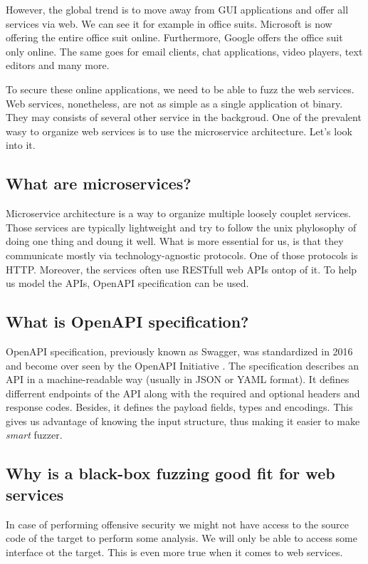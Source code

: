 However, the global trend is to move away from GUI applications and offer all services via web. We can see it for example in office suits. Microsoft is now offering the entire office suit online. Furthermore, Google offers the office suit only online. The same goes for email clients, chat applications, video players, text editors and many more.

To secure these online applications, we need to be able to fuzz the web services. Web services, nonetheless, are not as simple as a single application ot binary. They may consists of several other service in the backgroud. One of the prevalent wasy to organize web services is to use the microservice architecture. Let's look into it.

\subsection{What are microservices?}
Microservice architecture is a way to organize multiple loosely couplet services. Those services are typically lightweight and try to follow the unix phylosophy of doing one thing and doung it well. What is more essential for us, is that they communicate mostly via technology-agnostic protocols. One of those protocols is HTTP. Moreover, the services often use RESTfull web APIs ontop of it. To help us model the APIs, OpenAPI specification can be used.

\subsection{What is OpenAPI specification?}
OpenAPI specification, previously known as Swagger, was standardized in 2016 and become over seen by the OpenAPI Initiative \cite{openapi2020main}. The specification describes an API in a machine-readable way (usually in JSON or YAML format). It defines differrent endpoints of the API along with the required and optional headers and response codes. Besides, it defines the payload fields, types and encodings. This gives us advantage of knowing the input structure, thus making it easier to make \emph{smart} fuzzer.

\subsection{Why is a black-box fuzzing good fit for web services}
In case of performing offensive security we might not have access to the source code of the target to perform some analysis. We will only be able to access some interface ot the target. This is even more true when it comes to web services.
